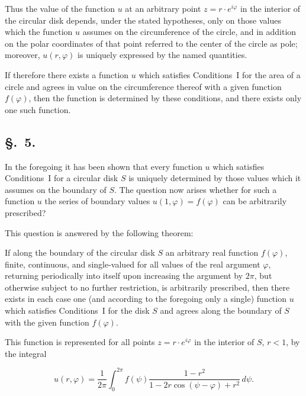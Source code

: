 \documentclass{article}
\begin{document}

Thus the value of the function $u$ at an arbitrary point $z = r \cdot e^{i\varphi}$ in the interior of the circular disk depends, under the stated hypotheses, only on those values which the function $u$ assumes on the circumference of the circle, and in addition on the polar coordinates of that point referred to the center of the circle as pole; moreover, $u(r, \varphi)$ is uniquely expressed by the named quantities.



If therefore there exists a function $u$ which satisfies Conditions~I for the area of a circle and agrees in value on the circumference thereof with a given function $f(\varphi)$, then the function is determined by these conditions, and there exists only one such function.




\subsection*{§.~5.}



In the foregoing it has been shown that every function $u$ which satisfies Conditions~I for a circular disk $S$ is uniquely determined by those values which it assumes on the boundary of $S$. The question now arises whether for such a function $u$ the series of boundary values $u(1, \varphi) = f(\varphi)$ can be arbitrarily prescribed?



This question is answered by the following theorem:



If along the boundary of the circular disk $S$ an arbitrary real function $f(\varphi)$, finite, continuous, and single-valued for all values of the real argument $\varphi$, returning periodically into itself upon increasing the argument by $2\pi$, but otherwise subject to no further restriction, is arbitrarily prescribed, then there exists in each case one (and according to the foregoing only a single) function $u$ which satisfies Conditions~I for the disk $S$ and agrees along the boundary of $S$ with the given function $f(\varphi)$.



This function is represented for all points $z = r \cdot e^{i\varphi}$ in the interior of $S$, $r < 1$, by the integral

\[

u(r, \varphi) = \frac{1}{2\pi} \int_0^{2\pi} f(\psi) \frac{1 - r^2}{1 - 2r \cos(\psi - \varphi) + r^2}\,d\psi.

\]
\end{document}
